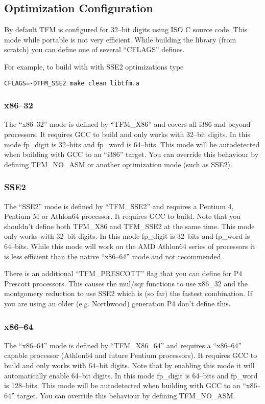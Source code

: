 \documentclass[b5paper]{book}
\begin{document}
\subsection{Optimization Configuration}
By default TFM is configured for 32--bit digits using ISO C source code.  This mode while portable
is not very efficient.  While building the library (from scratch) you can define one of 
several ``CFLAGS'' defines.

For example, to build with with SSE2 optimizations type 

\begin{verbatim}
CFLAGS=-DTFM_SSE2 make clean libtfm.a
\end{verbatim}

\subsubsection{x86--32}  The ``x86--32'' mode is defined by ``TFM\_X86'' and covers all
i386 and beyond processors.  It requires GCC to build and only works with 32--bit digits.  In this 
mode fp\_digit is 32--bits and fp\_word is 64--bits.  This mode will be autodetected when building 
with GCC to an  ``i386'' target.  You can override this behaviour by defining TFM\_NO\_ASM or 
another optimization mode (such as SSE2).

\subsubsection{SSE2} The ``SSE2'' mode is defined by ``TFM\_SSE2'' and requires a Pentium 4, Pentium
M or Athlon64 processor.  It requires GCC to build.  Note that you shouldn't define both
TFM\_X86 and TFM\_SSE2 at the same time.   This mode only works with 32--bit digits.  In this 
mode fp\_digit is 32--bits and fp\_word is 64--bits.  While this mode will work on the AMD Athlon64 
series of processors it is less efficient than the native ``x86--64'' mode and not recommended.

There is an additional ``TFM\_PRESCOTT'' flag that you can define for P4 Prescott processors.  This causes
the mul/sqr functions to use x86\_32 and the montgomery reduction to use SSE2 which is (so far) the fastest
combination.  If you are using an older (e.g. Northwood) generation P4 don't define this.

\subsubsection{x86--64}  The ``x86--64'' mode is defined by ``TFM\_X86\_64'' and requires a 
``x86--64'' capable processor (Athlon64 and future Pentium processors).  It requires GCC to
build and only works with 64--bit digits.  Note that by enabling this mode it will automatically
enable 64--bit digits.  In this mode fp\_digit is 64--bits and fp\_word is 128--bits.  This mode will
be autodetected when building with GCC to an ``x86--64'' target.  You can override this behaviour by defining
TFM\_NO\_ASM.
\end{document}
